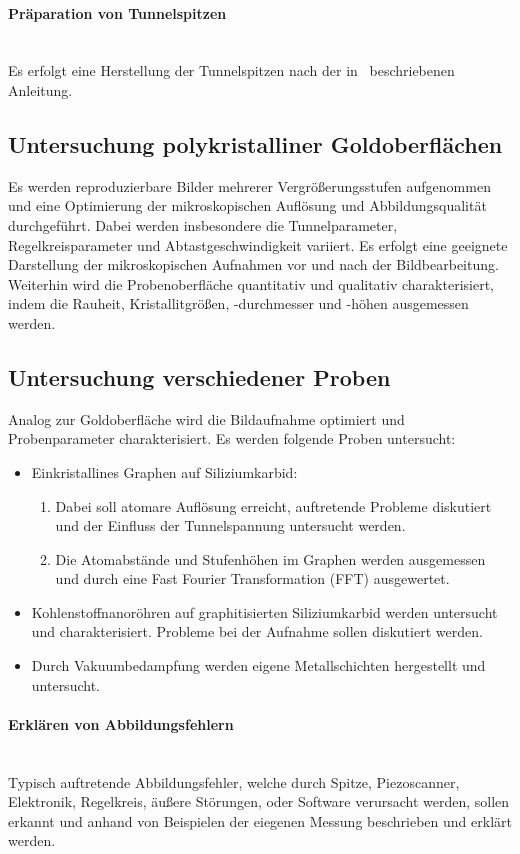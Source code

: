 \documentclass[a4paper,twoside,final]{article}
\begin{document}
\paragraph*{Präparation von Tunnelspitzen}$~$\\
Es erfolgt eine Herstellung der Tunnelspitzen nach der in~\cite{Nanosurf} beschriebenen Anleitung.
\subsection{Untersuchung polykristalliner Goldoberflächen}
Es werden reproduzierbare Bilder mehrerer Vergrößerungsstufen aufgenommen und eine Optimierung der mikroskopischen Auflösung und Abbildungsqualität durchgeführt. Dabei werden insbesondere die Tunnelparameter, Regelkreisparameter und Abtastgeschwindigkeit variiert. Es erfolgt eine geeignete Darstellung der mikroskopischen Aufnahmen vor und nach der Bildbearbeitung.\\
Weiterhin wird die Probenoberfläche quantitativ und qualitativ charakterisiert, indem die Rauheit, Kristallitgrößen, -durchmesser und -höhen ausgemessen werden.
\subsection{Untersuchung verschiedener Proben}
Analog zur Goldoberfläche wird die Bildaufnahme optimiert und Probenparameter charakterisiert. Es werden folgende Proben untersucht:
\begin{itemize}
  \item Einkristallines Graphen auf Siliziumkarbid:
  \begin{enumerate}
    \item Dabei soll atomare Auflösung erreicht, auftretende Probleme diskutiert und der Einfluss der Tunnelspannung untersucht werden.
    \item Die Atomabstände und Stufenhöhen im Graphen werden ausgemessen und durch eine Fast Fourier Transformation (FFT) ausgewertet.
  \end{enumerate}
  \item Kohlenstoffnanoröhren auf graphitisierten Siliziumkarbid werden untersucht und charakterisiert. Probleme bei der Aufnahme sollen diskutiert werden.
  \item Durch Vakuumbedampfung werden eigene Metallschichten hergestellt und untersucht.
\end{itemize}

\paragraph{Erklären von Abbildungsfehlern}$~$\\
Typisch auftretende Abbildungsfehler, welche durch Spitze, Piezoscanner, Elektronik, Regelkreis, äußere Störungen, oder Software verursacht werden, sollen erkannt und anhand von Beispielen der eiegenen Messung beschrieben und erklärt werden.
\end{document}
